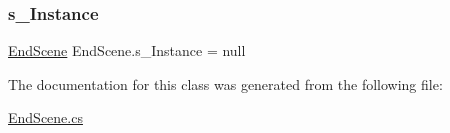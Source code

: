 \mbox{\label{class_end_scene_a6cf08b038600652991ae00a9cf2a949b}} 
\subsubsection{\texorpdfstring{s\+\_\+\+Instance}{s\_Instance}}
{\footnotesize\ttfamily \mbox{\hyperlink{class_end_scene}{End\+Scene}} End\+Scene.\+s\+\_\+\+Instance = null\hspace{0.3cm}{\ttfamily [static]}}



The documentation for this class was generated from the following file\+:\begin{DoxyCompactItemize}
\item 
\mbox{\hyperlink{_end_scene_8cs}{End\+Scene.\+cs}}\end{DoxyCompactItemize}
